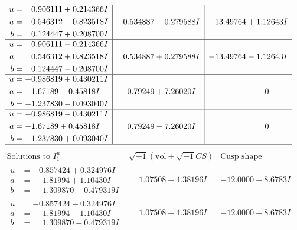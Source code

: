 \documentclass[1p]{elsarticle_modified}
\theoremstyle{definition}
\newcommand{\I}{\sqrt{-1}}
\begin{document}
$$\begin{array}{c|c|c}
\begin{aligned}
u &= \phantom{-}0.906111 + 0.214366 I \\
a &= \phantom{-}0.546312 - 0.823518 I \\
b &= \phantom{-}0.124447 + 0.208700 I\end{aligned}
 & \phantom{-}0.534887 - 0.279588 I & -13.49764 + 1.12643 I \\ \hline\begin{aligned}
u &= \phantom{-}0.906111 - 0.214366 I \\
a &= \phantom{-}0.546312 + 0.823518 I \\
b &= \phantom{-}0.124447 - 0.208700 I\end{aligned}
 & \phantom{-}0.534887 + 0.279588 I & -13.49764 - 1.12643 I \\ \hline\begin{aligned}
u &= -0.986819 + 0.430211 I \\
a &= -1.67189 - 0.45818 I \\
b &= -1.237830 - 0.093040 I\end{aligned}
 & \phantom{-}0.79249 + 7.26020 I & \phantom{-0.000000 } 0 \\ \hline\begin{aligned}
u &= -0.986819 - 0.430211 I \\
a &= -1.67189 + 0.45818 I \\
b &= -1.237830 + 0.093040 I\end{aligned}
 & \phantom{-}0.79249 - 7.26020 I & \phantom{-0.000000 } 0\\
 \hline 
 \end{array}$$\newpage$$\begin{array}{c|c|c}  
\text{Solutions to }I^u_{1}& \I (\text{vol} + \sqrt{-1}CS) & \text{Cusp shape}\\
 \hline 
\begin{aligned}
u &= -0.857424 + 0.324976 I \\
a &= \phantom{-}1.81994 + 1.10430 I \\
b &= \phantom{-}1.309870 + 0.479319 I\end{aligned}
 & \phantom{-}1.07508 + 4.38196 I & -12.0000 - 8.6783 I \\ \hline\begin{aligned}
u &= -0.857424 - 0.324976 I \\
a &= \phantom{-}1.81994 - 1.10430 I \\
b &= \phantom{-}1.309870 - 0.479319 I\end{aligned}
 & \phantom{-}1.07508 - 4.38196 I & -12.0000 + 8.6783 I \\ \hline\begin{aligned}

\end{aligned}
\end{array}$$
\end{document}
